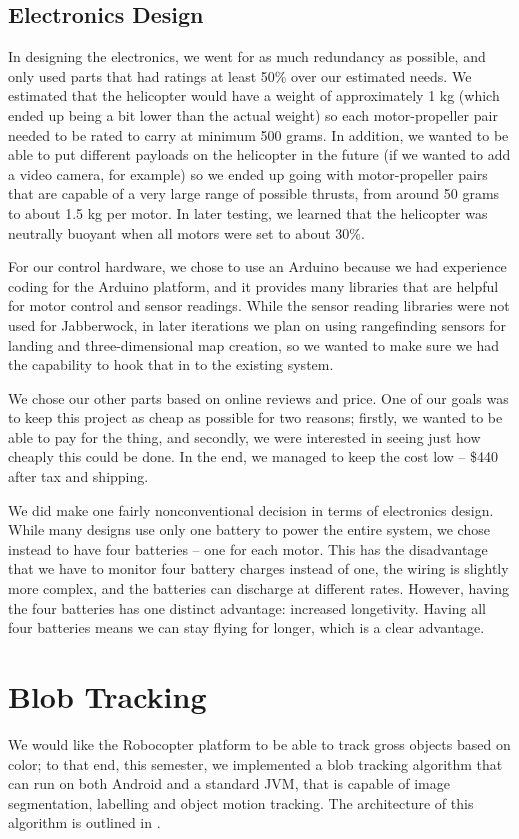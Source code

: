 \subsection{Electronics Design}
In designing the electronics, we went for as much redundancy as
possible, and only used parts that had ratings at least 50\% over our
estimated needs. We estimated that the helicopter would have a weight
of approximately 1 kg (which ended up being a bit lower than the
actual weight) so each motor-propeller pair needed to be rated to
carry at minimum 500 grams. In addition, we wanted to be able to put
different payloads on the helicopter in the future (if we wanted to
add a video camera, for example) so we ended up going with
motor-propeller pairs that are capable of a very large range of
possible thrusts, from around 50 grams to about 1.5 kg per motor. In
later testing, we learned that the helicopter was neutrally buoyant
when all motors were set to about 30\%.

For our control hardware, we chose to use an Arduino because we had
experience coding for the Arduino platform, and it provides many
libraries that are helpful for motor control and sensor
readings. While the sensor reading libraries were not used for
Jabberwock, in later iterations we plan on using rangefinding sensors
for landing and three-dimensional map creation, so we wanted to make
sure we had the capability to hook that in to the existing system.

We chose our other parts based on online reviews and price. One of our
goals was to keep this project as cheap as possible for two reasons;
firstly, we wanted to be able to pay for the thing, and secondly, we
were interested in seeing just how cheaply this could be done. In the
end, we managed to keep the cost low -- \$440 after tax and shipping.

We did make one fairly nonconventional decision in terms of
electronics design. While many designs use only one battery to power
the entire system, we chose instead to have four batteries -- one for
each motor. This has the disadvantage that we have to monitor four
battery charges instead of one, the wiring is slightly more complex,
and the batteries can discharge at different rates. However, having
the four batteries has one distinct advantage: increased
longetivity. Having all four batteries means we can stay flying for
longer, which is a clear advantage.

\section{Blob Tracking}
We would like the Robocopter platform to be able to track gross
objects based on color; to that end, this semester, we implemented a
blob tracking algorithm that can run on both Android and a standard
JVM, that is capable of image segmentation, labelling and object
motion tracking. The architecture of this algorithm is outlined in
.

